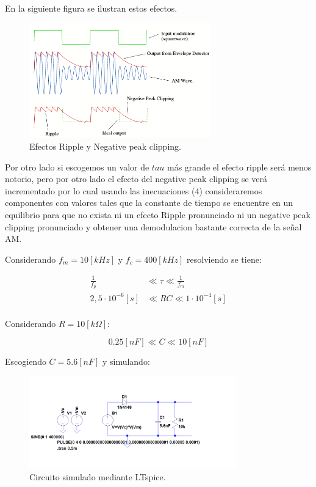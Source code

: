 \documentclass[letterpaper, titlepage]{article}
\begin{document}
		En la siguiente figura se ilustran estos efectos.	
	
		\begin{figure}[H]
			\centering
				\includegraphics[width=0.7\textwidth]{demodulacion1}
			\caption{Efectos Ripple y Negative peak clipping.}
			\label{fig:ejemplo}
		\end{figure}


		Por otro lado si escogemos un valor de $tau$ más grande el efecto ripple será menos notorio, pero por otro lado el efecto del negative peak clipping se verá incrementado por lo cual usando las inecuaciones (4) consideraremos componentes con valores tales que la constante de tiempo se encuentre en un equilibrio 
		para que no exista ni un efecto Ripple pronunciado ni un negative peak clipping pronunciado y obtener una demodulacion bastante correcta de la señal AM.
		
		Considerando $ f_{m} = 10[kHz] $ y $ f_{c} = 400[kHz] $ resolviendo se tiene:

		\begin{align*}
			\frac{1}{f_{p}}& \ll \tau \ll  \frac{1}{f_{m}} \\
			2,5\cdot10^{-6} [s] &  \ll RC \ll  1\cdot10^{-4} [s] \\
		\end{align*}

		Considerando $ R = 10[k \Omega] $:

		\begin{equation}
			0.25[nF]   \ll C \ll  10[nF]
		\end{equation}

		\newpage
		Escogiendo $ C = 5.6[nF] $ y simulando:

		\begin{figure}[H]
			\centering
				\includegraphics[width=0.8\textwidth]{circuitosim}
			\caption{Circuito simulado mediante LTspice.}
			\label{fig:ejemplo}
		\end{figure}
\end{document}
